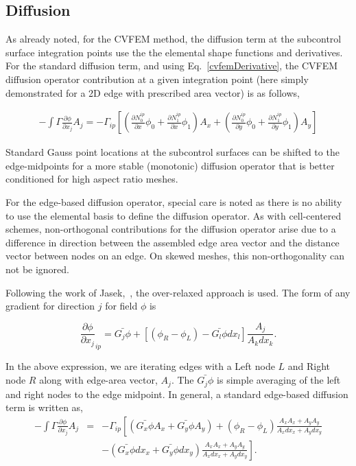 \subsection{Diffusion}
As already noted, for the CVFEM method, the diffusion term at the 
subcontrol surface integration points use the the elemental
shape functions and derivatives. For the standard diffusion term, 
and using  Eq.~\ref{cvfemDerivative}, the CVFEM diffusion operator
contribution at a given integration point (here simply demonstrated 
for a 2D edge with prescribed area vector) is as follows,

\begin{eqnarray}
  -\int \Gamma \frac{\partial \phi}{\partial x_j} A_j = - \Gamma_{ip} \left[ \left(\frac{\partial N^{ip}_0} {\partial x} \phi_0 + \frac{\partial N^{ip}_1} {\partial x} \phi_1 \right) A_x + \left(\frac{\partial N^{ip}_0} {\partial y} \phi_0 + \frac{\partial N^{ip}_1} {\partial y} \phi_1 \right) A_y \right]
\end{eqnarray}

Standard Gauss point locations at the subcontrol surfaces can be shifted to the edge-midpoints for a more stable (monotonic)
diffusion operator that is better conditioned for high aspect ratio meshes. 

For the edge-based diffusion operator, special care is noted
as there is no ability to use the elemental basis to define
the diffusion operator. As with cell-centered schemes, non-orthogonal 
contributions for the diffusion operator arise due to a difference in
direction between the assembled edge area vector and the
distance vector between nodes on an edge. On skewed meshes,
this non-orthogonality can not be ignored.

Following the work of Jasek,~\cite{Jasek:1996},
the over-relaxed approach is used. The form of any gradient
for direction $j$ for field $\phi$ is

\begin{equation}
  \frac{\partial \phi}{\partial x_j}_{ip} = \bar{G_j\phi} + \left[ \left(\phi_R - \phi_L \right) 
- \bar{G_l\phi}dx_l \right] \frac{A_j}{A_k dx_k}.
\end{equation}
\label{generalGrad}

In the above expression, we are iterating edges with a Left node $L$ and Right node $R$ along
with edge-area vector, $A_j$. The $\bar{G_j \phi}$ is simple averaging of the left and right nodes
to the edge midpoint. 
In general, a standard edge-based diffusion term is written as,
\begin{eqnarray}
  -\int \Gamma \frac{\partial \phi}{\partial x_j} A_j &=& - \Gamma_{ip} \left[ \left(\bar{G_x \phi}A_x + \bar{G_y \phi}A_y \right)
    + \left( \phi_R -  \phi_L \right) \frac{A_x A_x + A_y A_y}{A_x dx_x + A_y dx_y} \right. \nonumber \\ &&
  - \left. \left( \bar{G_x \phi}dx_x + \bar{G_y \phi}dx_y \right) \frac{A_x A_x + A_y A_y} {A_x dx_x + A_y dx_y} \right].
\end{eqnarray}

